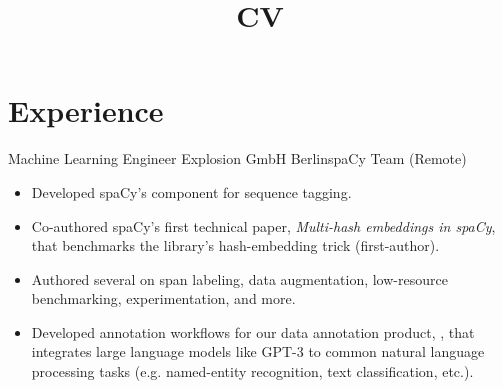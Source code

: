 \documentclass[12pt,a4paper]{moderncv}
\title{CV}
\begin{document}
\maketitle


\section{Experience}

{Machine Learning Engineer}
{Explosion GmbH}
{Berlin}{spaCy Team (Remote)}
{
    \begin{itemize}
        \item Developed spaCy's {\color{blue}} component for sequence
        tagging.
        \item Co-authored spaCy's first technical paper, \textit{Multi-hash
        embeddings in spaCy}, that benchmarks the library's hash-embedding trick
        (first-author).
        \item Authored several {\color{blue}} on span labeling,
        data augmentation, low-resource benchmarking, experimentation, and more.
        \item Developed annotation workflows for our data annotation product,
        {\color{blue}}, that integrates
        large language models like GPT-3 to common natural language processing
        tasks (e.g. named-entity recognition, text classification, etc.). 
    \end{itemize}
}
\end{document}
